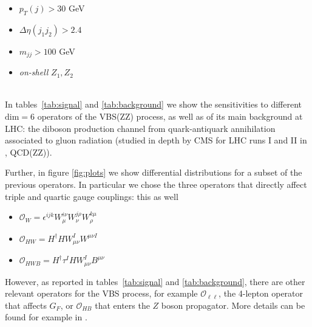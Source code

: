 \documentclass[../report.tex]{subfiles}
\begin{document}
\begin{itemize}
\item $p_T (j) > 30$ GeV
\item $\Delta \eta (j_1 j_2) > 2.4$
\item $ m_{jj} > 100$ GeV
\item \emph{on-shell} $Z_1,Z_2$ 
\end{itemize}
%

 
 
\\ 
In tables~\ref{tab:signal} and \ref{tab:background} we show the sensitivities to different $\mathrm{dim=6}$ operators of the VBS(ZZ) process, as well as of its main background at LHC: the diboson production channel from quark-antiquark annihilation associated to gluon radiation (studied in depth by CMS for LHC runs I and II in \cite{Sirunyan:2018vkx}, QCD(ZZ)). 

Further, in figure \ref{fig:plots} we show differential distributions for a subset of the previous operators. In particular we chose the three operators that directly affect triple and quartic gauge couplings: {\color{red} this as well}

\begin{itemize}
\item $\mathcal{O}_W = \epsilon^{ijk} W_{\mu}^{i \nu} W_{\nu}^{j \rho} W_{\rho}^{k \mu} $
\item $\mathcal{O}_{HW} = H^{\dagger} H W_{\mu \nu}^I W^{\mu \nu I}$
\item $\mathcal{O}_{HWB} = H^{\dagger} \tau^I H W_{\mu \nu}^I B^{\mu \nu}$
\end{itemize}
 
However, as reported in tables~\ref{tab:signal} and \ref{tab:background}, there are other relevant operators for the VBS process, 
for example $\mathcal{O}_{\ell \ell}$, the 4-lepton operator that affects $G_F$, or $\mathcal{O}_{HB}$ that enters the $Z$ boson propagator. More details can be found for example in \cite{Ghezzi:2015vva}.
 
\end{document}
